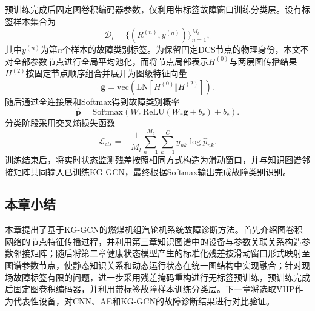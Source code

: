 预训练完成后固定图卷积编码器参数，仅利用带标签故障窗口训练分类层。设有标签样本集合为
\begin{equation}
\mathcal D_l=\{(R^{(n)},y^{(n)})\}_{n=1}^{M_l},
\end{equation}
其中$y^{(n)}$为第$n$个样本的故障类别标签。为保留固定DCS节点的物理身份，本文不对全部参数节点进行全局平均池化，而将节点局部表示$H^{(0)}$与两层图传播结果$H^{(2)}$按固定节点顺序组合并展开为图级特征向量
\begin{equation}
\mathbf g=\mathrm{vec}\left(\mathrm{LN}[H^{(0)}\Vert H^{(2)}]\right) .
\end{equation}
随后通过全连接层和Softmax得到故障类别概率
\begin{equation}
\hat{\mathbf p}=\mathrm{Softmax}\left(W_c\,\mathrm{ReLU}(W_r\mathbf g+b_r)+b_c\right) .
\end{equation}
分类阶段采用交叉熵损失函数
\begin{equation}
\mathcal L_{cls}=-\frac{1}{M_l}\sum_{n=1}^{M_l}\sum_{k=1}^{C}y_{nk}\log \hat p_{nk} .
\end{equation}
训练结束后，将实时状态监测残差按照相同方式构造为滑动窗口，并与知识图谱邻接矩阵共同输入已训练KG-GCN，最终根据Softmax输出完成故障类别识别。


\subsection{本章小结}

本章提出了基于KG-GCN的燃煤机组汽轮机系统故障诊断方法。首先介绍图卷积网络的节点特征传播过程，并利用第三章知识图谱中的设备与参数关联关系构造参数邻接矩阵；随后将第二章健康状态模型产生的标准化残差按滑动窗口形式映射至图谱参数节点，使静态知识关系和动态运行状态在统一图结构中实现融合；针对现场故障标签有限的问题，进一步采用残差掩码重构进行无标签预训练，预训练完成后固定图卷积编码器，并利用带标签故障样本训练分类层。下一章将选取VHP作为代表性设备，对CNN、AE和KG-GCN的故障诊断结果进行对比验证。